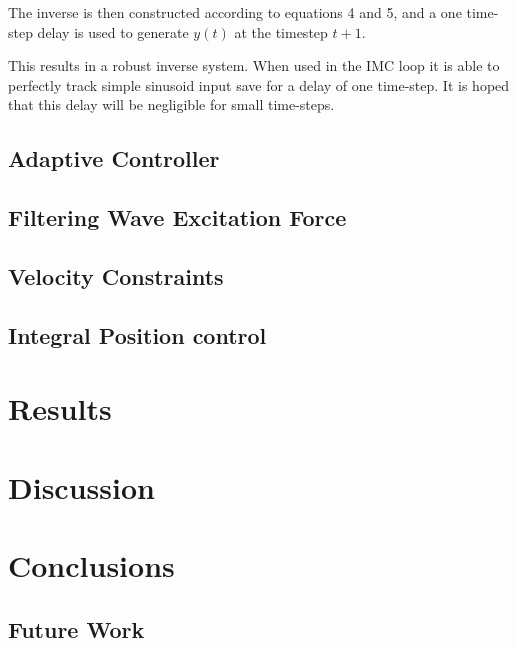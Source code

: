 \documentclass{report}
\begin{document}
The inverse is then constructed according to equations 4 and 5, and a one time-step delay is used to generate $y(t)$ at the timestep $t+1$.

This results in a robust inverse system. When used in the IMC loop it is able to perfectly track simple sinusoid input save for a delay of one time-step. It is hoped that this delay will be negligible for small time-steps.

\section{Adaptive Controller}

\section{Filtering Wave Excitation Force}

\section{Velocity Constraints}

\section{Integral Position control}

\chapter{Results}

\chapter{Discussion}

\chapter{Conclusions}

\section{Future Work}





\end{document}
